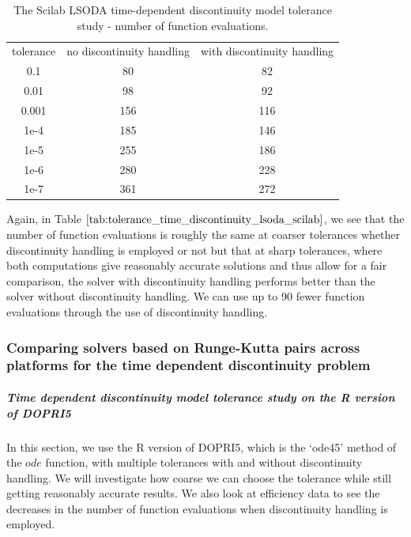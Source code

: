 \begin{table}[H]
\caption {The Scilab LSODA time-dependent discontinuity model tolerance study - number of function evaluations.} 
\label{tab:tolerance_time_discontinuity_lsoda_scilab} 
\begin{center}
\begin{tabular}{ c c c }
tolerance & no discontinuity handling & with discontinuity handling \\ 
0.1 & 80 & 82 \\
0.01 & 98 & 92 \\
0.001 & 156 & 116 \\
1e-4 & 185 & 146 \\
1e-5 & 255 & 186 \\
1e-6 & 280 & 228 \\
1e-7 & 361 & 272 \\
\end{tabular}
\end{center}
\end{table}
Again, in Table $\ref{tab:tolerance_time_discontinuity_lsoda_scilab}$, we see that the number of function evaluations is roughly the same at coarser tolerances whether discontinuity handling is employed or not but that at sharp tolerances, where both computations give reasonably accurate solutions and thus allow for a fair comparison, the solver with discontinuity handling performs better than the solver without discontinuity handling. We can use up to 90 fewer function evaluations through the use of discontinuity handling. 

\subsubsection{Comparing solvers based on Runge-Kutta pairs across platforms for the time dependent discontinuity problem}
\subparagraph{Time dependent discontinuity model tolerance study on the R version of DOPRI5}
In this section, we use the R version of DOPRI5, which is the `ode45' method of the $ode$ function, with multiple tolerances with and without discontinuity handling. We will investigate how coarse we can choose the tolerance while still getting reasonably accurate results. We also look at efficiency data to see the decreases in the number of function evaluations when discontinuity handling is employed.

